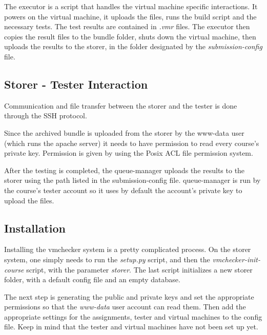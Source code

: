 \begin{center}
\end{center}

The executor is a script that handles the virtual machine specific interactions.
It powers on the virtual machine, it uploads the files, runs the build script and
 the necessary tests. The test results are contained in \textit{.vmr} files.
The executor then copies the result files to the bundle folder, shuts down the
virtual machine, then uploads the results to the storer, in the folder designated
by the \textit{submission-config} file.


\subsection{Storer - Tester Interaction}
\label{sub-sec:interaction}

Communication and file transfer between the storer and the tester is done
through the SSH protocol. 

Since the archived bundle is uploaded from the storer by the www-data user (which
runs the apache server) it needs to have permission to read every course's private key. 
Permission is given by using the Posix ACL file permission system.

After the testing is completed, the queue-manager uploads the results to the storer
using the path listed in the submission-config file. queue-manager is run by the 
course's tester account so it uses by default the account's private key to upload
the files.

\subsection{Installation}
\label{sub-sec:install}

Installing the vmchecker system is a pretty complicated process.
On the storer system, one simply needs to run the \textit{setup.py} script, and then 
the \textit{vmchecker-init-course} script, with the parameter \textit{storer}. The last script
initializes a new storer folder, with a default config file and an empty database.

The next step is generating the public and private keys and set the appropriate 
permissions so that the \textit{www-data} user account can read them. Then add the appropriate 
settings for the assignments, tester and virtual machines to the config file.
Keep in mind that the tester and virtual machines have not been set up yet.

